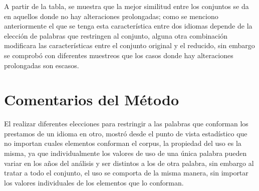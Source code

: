 A partir de la tabla, se muestra que la mejor similitud entre los conjuntos se da en aquellos donde no hay alteraciones prolongadas; como se menciono anteriormente el que se tenga esta característica entre dos idiomas depende de la elección de palabras que restringen al conjunto, alguna otra combinación modificara las características entre  el conjunto original y el reducido, sin embargo se comprobó con diferentes muestreos que los casos donde hay alteraciones prolongadas son escasos.


\section{Comentarios del Método}

El realizar diferentes elecciones para restringir a las palabras que conforman los prestamos de un idioma en otro, mostró desde el punto de vista estadístico que no importan cuales elementos conforman el corpus, la propiedad del uso es la misma, ya que individualmente los valores de uso de una única palabra pueden variar en los años del análisis y ser distintos a los de otra palabra, sin embargo al tratar a todo el conjunto, el uso se comporta de la misma  manera, sin importar los valores individuales de los elementos que lo conforman. 








